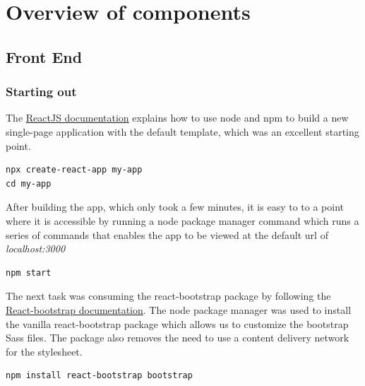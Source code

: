 \section{Overview of components}
\subsection{Front End}
\subsubsection{Starting out}
The \underline{\href{https://react-bootstrap.github.io/getting-started/introduction/}{ReactJS documentation}} explains how to use node and npm to build a new single-page application with the default template, which was an excellent starting point.
\begin{verbatim}
npx create-react-app my-app
cd my-app
\end{verbatim}

After building the app, which only took a few minutes, it is easy to to a point where it is accessible by running a node package manager command which runs a series of commands that enables the app to be viewed at the default url of \emph{localhost:3000}
\begin{verbatim}
npm start
\end{verbatim}

The next task was consuming the react-bootstrap package by following the \underline{\href{https://react-bootstrap.github.io/getting-started/introduction/}{React-bootstrap documentation}}. The node package manager was used to install the vanilla react-bootstrap package which allows us to customize the bootstrap Sass files. The package also removes the need to use a content delivery network for the stylesheet.
\begin{verbatim}
npm install react-bootstrap bootstrap
\end{verbatim}

